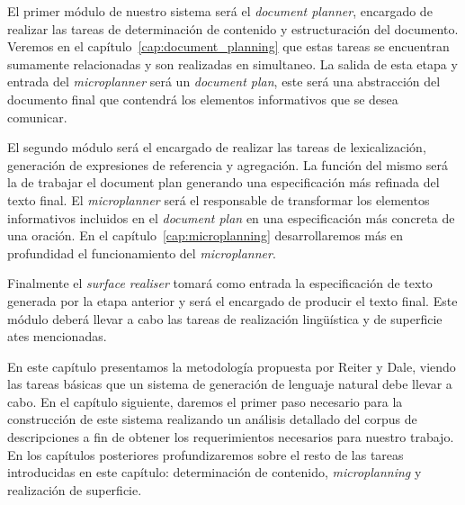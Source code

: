 El primer módulo de nuestro sistema será el \emph{document planner}, encargado de realizar las tareas de determinación de contenido y estructuración del documento. Veremos en el capítulo~\ref{cap:document_planning} que estas tareas se encuentran sumamente relacionadas y son realizadas en simultaneo. La salida de esta etapa y entrada del \emph{microplanner} será un \emph{document plan}, este será una abstracción del documento final que contendrá los elementos informativos que se desea comunicar.

El segundo módulo será el encargado de realizar las tareas de lexicalización, generación de expresiones de referencia y agregación. La función del mismo será la de trabajar el document plan generando una especificación más refinada del texto final. El \emph{microplanner} será el responsable de transformar los elementos informativos incluidos en el \textit{document plan} en una especificación más concreta de una oración. En el capítulo~\ref{cap:microplanning} desarrollaremos más en profundidad el funcionamiento del \textit{microplanner}.

Finalmente el \emph{surface realiser} tomará como entrada la especificación de texto generada por la etapa anterior y será el encargado de producir el texto final. Este módulo deberá llevar a cabo las tareas de realización lingüística y de superficie ates mencionadas.

\bigskip
En este capítulo presentamos la metodología propuesta por Reiter y Dale, viendo las tareas básicas que un sistema de generación de lenguaje natural debe llevar a cabo. En el capítulo siguiente, daremos el primer paso necesario para la construcción de este sistema realizando un análisis detallado del corpus de descripciones a fin de obtener los requerimientos necesarios para nuestro trabajo. En los capítulos posteriores profundizaremos sobre el resto de las tareas introducidas en este capítulo: determinación de contenido, \textit{microplanning} y realización de superficie.